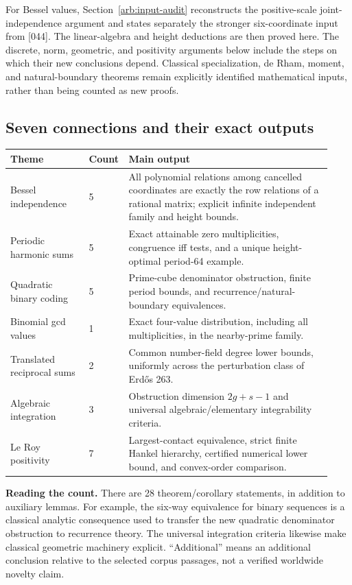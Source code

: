 \documentclass[11pt,a4paper]{article}
\theoremstyle{definition}
\theoremstyle{remark}
\numberwithin{equation}{section}
\begin{document}
For Bessel values, Section~\ref{arb:input-audit} reconstructs the
positive-scale joint-independence argument and states separately the
stronger six-coordinate input from [044]. The linear-algebra and
height deductions are then proved here. The discrete, norm, geometric,
and positivity arguments below include the steps on which their new
conclusions depend. Classical specialization, de Rham, moment, and
natural-boundary theorems remain explicitly identified mathematical
inputs, rather than being counted as new proofs.

\subsection{Seven connections and their exact outputs}

\begin{center}
\small
\begin{tabular}{@{}p{0.24\linewidth}p{0.07\linewidth}p{0.62\linewidth}@{}}
\toprule
Theme & Count & Main output\\
\midrule
Bessel independence & 5 & All polynomial relations among cancelled coordinates are exactly the row relations of a rational matrix; explicit infinite independent family and height bounds.\\
Periodic harmonic sums & 5 & Exact attainable zero multiplicities, congruence iff tests, and a unique height-optimal period-64 example.\\
Quadratic binary coding & 5 & Prime-cube denominator obstruction, finite period bounds, and recurrence/natural-boundary equivalences.\\
Binomial gcd values & 1 & Exact four-value distribution, including all multiplicities, in the nearby-prime family.\\
Translated reciprocal sums & 2 & Common number-field degree lower bounds, uniformly across the perturbation class of Erd\H{o}s 263.\\
Algebraic integration & 3 & Obstruction dimension $2g+s-1$ and universal algebraic/elementary integrability criteria.\\
Le Roy positivity & 7 & Largest-contact equivalence, strict finite Hankel hierarchy, certified numerical lower bound, and convex-order comparison.\\
\bottomrule
\end{tabular}
\end{center}

\textbf{Reading the count.}
There are 28 theorem/corollary statements, in addition to auxiliary
lemmas. For example, the six-way equivalence for binary sequences is
a classical analytic consequence used to transfer the new quadratic
denominator obstruction to recurrence theory. The universal integration
criteria likewise make classical geometric machinery explicit.
``Additional'' means an additional conclusion relative to the selected
corpus passages, not a verified worldwide novelty claim.
\end{document}
